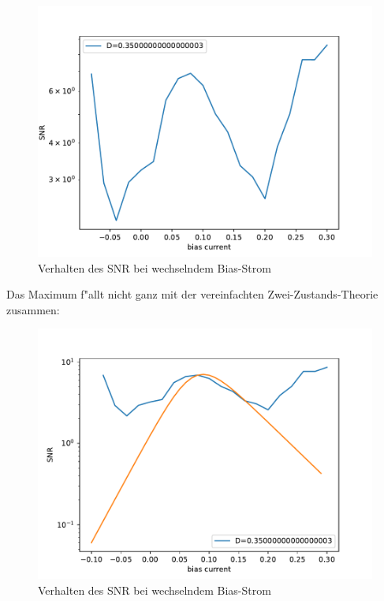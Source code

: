 \documentclass[12pt,a4paper]{article}
\begin{document}
\begin{figure}[H]
\centering
\includegraphics[scale=0.9]{snrreal9a.pdf}
\caption{Verhalten des SNR bei wechselndem Bias-Strom}
\label{snr9a}
\end{figure}
Das Maximum f"allt nicht ganz mit der vereinfachten Zwei-Zustands-Theorie zusammen:
\begin{figure}[H]
\centering
\includegraphics[scale=0.9]{snrreal9awf.pdf}
\caption{Verhalten des SNR bei wechselndem Bias-Strom}
\label{snr9awf}
\end{figure}
\end{document}
